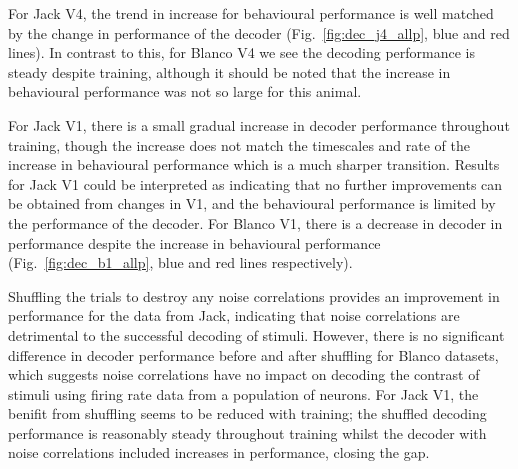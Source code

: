 For Jack \ac{V4}, the trend in increase for behavioural performance is well matched by the change in performance of the decoder (Fig.~\ref{fig:dec_j4_allp}, blue and red lines). In contrast to this, for Blanco \ac{V4} we see the decoding performance is steady despite training, although it should be noted that the increase in behavioural performance was not so large for this animal.

For Jack \ac{V1}, there is a small gradual increase in decoder performance throughout training, though the increase does not match the timescales and rate of the increase in behavioural performance which is a much sharper transition. Results for Jack \ac{V1} could be interpreted as indicating that no further improvements can be obtained from changes in \ac{V1}, and the behavioural performance is limited by the performance of the decoder.
For Blanco \ac{V1}, there is a decrease in decoder in performance despite the increase in behavioural performance (Fig.~\ref{fig:dec_b1_allp}, blue and red lines respectively). 

Shuffling the trials to destroy any noise correlations provides an improvement in performance for the data from Jack, indicating that noise correlations are detrimental to the successful decoding of stimuli. However, there is no significant difference in decoder performance before and after shuffling for Blanco datasets, which suggests noise correlations have no impact on decoding the contrast of stimuli using firing rate data from a population of neurons.
For Jack \ac{V1}, the benifit from shuffling seems to be reduced with training; the shuffled decoding performance is reasonably steady throughout training whilst the decoder with noise correlations included increases in performance, closing the gap.



